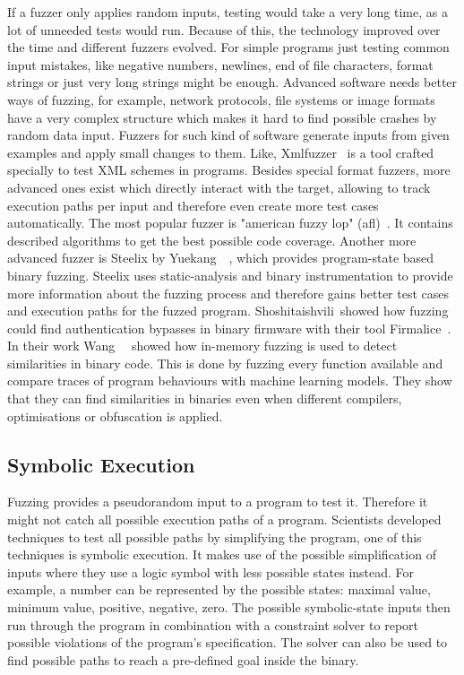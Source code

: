 If a fuzzer only applies random inputs, testing would take a very long time, as
a lot of unneeded tests would run. Because of this, the technology improved over
the time and different fuzzers evolved. For simple programs just testing common
input mistakes, like negative numbers, newlines, end of file characters, format
strings or just very long strings might be enough. Advanced software needs
better ways of fuzzing, for example, network protocols, file systems or image
formats have a very complex structure which makes it hard to find possible
crashes by random data input. Fuzzers for such kind of software generate inputs
from given examples and apply small changes to them. Like,
Xmlfuzzer~\cite{xmlfuzzer} is a tool crafted specially to test XML schemes in
programs. Besides special format fuzzers, more advanced ones exist which
directly interact with the target, allowing to track execution paths per input
and therefore even create more test cases automatically. The most popular fuzzer
is "american fuzzy lop" (afl)~\cite{aflweb}. It contains described algorithms to
get the best possible code coverage. Another more advanced fuzzer is Steelix by
Yuekang~\etal~\cite{steelix}, which provides program-state based binary fuzzing.
Steelix uses static-analysis and binary instrumentation to provide more
information about the fuzzing process and therefore gains better test cases and
execution paths for the fuzzed program. Shoshitaishvili~\etal showed how fuzzing
could find authentication bypasses in binary firmware with their tool
Firmalice~\cite{firmalice}. In their work Wang~\etal~\cite{inmemfuzzing} showed
how in-memory fuzzing is used to detect similarities in binary code. This is
done by fuzzing every function available and compare traces of program
behaviours with machine learning models. They show that they can find
similarities in binaries even when different compilers, optimisations or
obfuscation is applied.

\subsection{Symbolic Execution}

Fuzzing provides a pseudorandom input to a program to test it. Therefore it
might not catch all possible execution paths of a program. Scientists developed
techniques to test all possible paths by simplifying the program,  one of this
techniques is symbolic execution. It makes use of the possible simplification of
inputs where they use a logic symbol with less possible states instead. For
example, a number can be represented by the possible states: maximal value,
minimum value, positive, negative, zero. The possible symbolic-state inputs then
run through the program in combination with a constraint solver to report
possible violations of the program's specification. The solver can also be used
to find possible paths to reach a pre-defined goal inside the binary.

